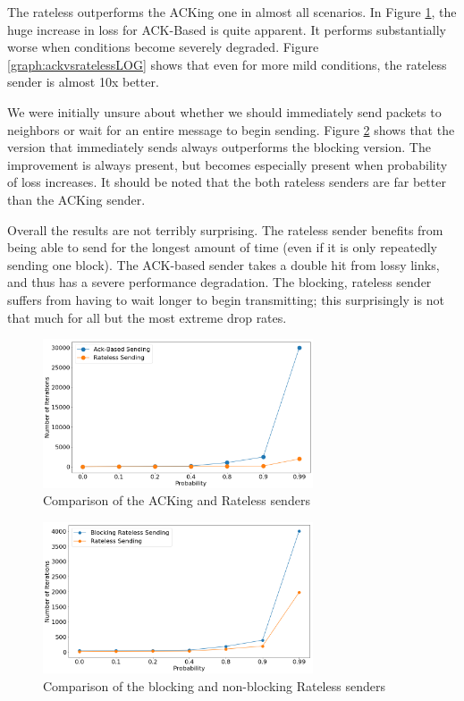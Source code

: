 The rateless outperforms the ACKing one in almost all scenarios. In Figure \ref{graph:ackvsrateless}, the huge increase in loss for ACK-Based is quite apparent. It performs substantially worse when conditions become severely degraded. Figure \ref{graph:ackvsratelessLOG} shows that even for more mild conditions, the rateless sender is almost 10x better.

We were initially unsure about whether we should immediately send packets to neighbors or wait for an entire message to begin sending. Figure \ref{graph:blockingvsnot} shows that the version that immediately sends always outperforms the blocking version. The improvement is always present, but becomes especially present when probability of loss increases. It should be noted that the both rateless senders are far better than the ACKing sender.

Overall the results are not terribly surprising. The rateless sender benefits from being able to send for the longest amount of time (even if it is only repeatedly sending one block). The ACK-based sender takes a double hit from lossy links, and thus has a severe performance degradation. The blocking, rateless sender suffers from having to wait longer to begin transmitting; this surprisingly is not that much for all but the most extreme drop rates.

\begin{figure}[tp]
\centering
\noindent
\includegraphics[width=8cm]{figures/big_font/ack_comp.png}
\caption{Comparison of the ACKing and Rateless senders}
\label{graph:ackvsrateless}
\end{figure}


\begin{figure}[tp]
\centering
\noindent
\includegraphics[width=8cm]{figures/big_font/block_comp.png}
\caption{Comparison of the blocking and non-blocking Rateless senders}
\label{graph:blockingvsnot}
\end{figure}


